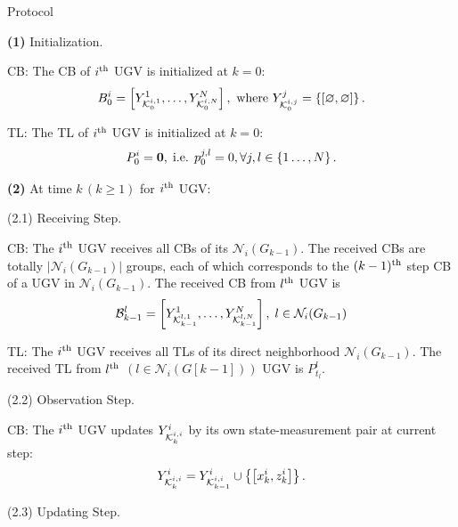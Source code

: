 	
	\begin{algorithm}
		\caption{{\proto} Protocol}
		\label{alg:lifo}
		\begin{algorithmic}
			\State \textbf{(1)} Initialization.
			
			
			CB: 
			The CB of $i^\text{th}$ UGV is initialized at $k=0$:
			\small\begin{equation*}
				{B^i_0=\left[ Y^1_{\mathcal{K}^{i,1}_{0}},\dots,Y^N_{\mathcal{K}^{i,N}_{0}}\right], \text{ where } Y^j_{\mathcal{K}^{i,j}_0} = \left\lbrace\left[ \varnothing,\varnothing\right]\right\rbrace.}
			\end{equation*}\normalsize
			
			TL:
			The TL of $i^\text{th}$ UGV is initialized at $k=0$:
			\small\begin{equation*}
				P^i_0 = \mathbf{0},\;\text{i.e. } p^{j,l}_0=0, \forall j,l\in \left\lbrace 1\dots,N\right\rbrace.
			\end{equation*}\normalsize
			
			\State \textbf{(2)} At time $k\,(k\geq 1)$ for $i^\text{th}$ UGV:	
			
			\State (2.1) Receiving Step.
			
			CB:	The $i^\text{th}$ UGV receives all CBs of its {\dnbhd} $\mathcal{N}_i(G_{k-1})$.
			The received CBs are totally $|\mathcal{N}_i(G_{k-1})|$ groups, each of which corresponds to the $(k-1)^\text{th}$ step CB of a UGV in $\mathcal{N}_i(G_ {k-1})$. 
			The received CB from $l^\text{th}$ UGV is
			\small\begin{equation*}
				\mathcal{B}^l_{k-1}=\left[Y^1_{\mathcal{K}^{l,1}_{k-1}},\dots,Y^N_{\mathcal{K}^{l,N}_{k-1}}\right],\; l\in\mathcal{N}_i(G_{k-1})
			\end{equation*}\normalsize
			
			TL: The $i^\text{th}$ UGV receives all TLs of its direct neighborhood $\mathcal{N}_i(G_{k-1})$.
			The received TL from $l^\text{th}$  $\left(l\in \mathcal{N}_i(G[k-1])\right)$ UGV is $P^l_{t_l}$.
			\newline
			
			\State (2.2) Observation Step.
			
			CB: The $i^\text{th}$ UGV updates $Y^i_{\mathcal{K}^{i,i}_{k}}$ by its own state-measurement pair at current step:
			\small\begin{equation*}
			Y^i_{\mathcal{K}^{i,i}_{k}} = Y^i_{\mathcal{K}^{i,i}_{k-1}} \cup \left\lbrace{\left[x^i_k,z^i_k\right]}\right\rbrace.
			\end{equation*}\normalsize
						
			\State (2.3) Updating Step.
			

\end{algorithmic}
\end{algorithm}
